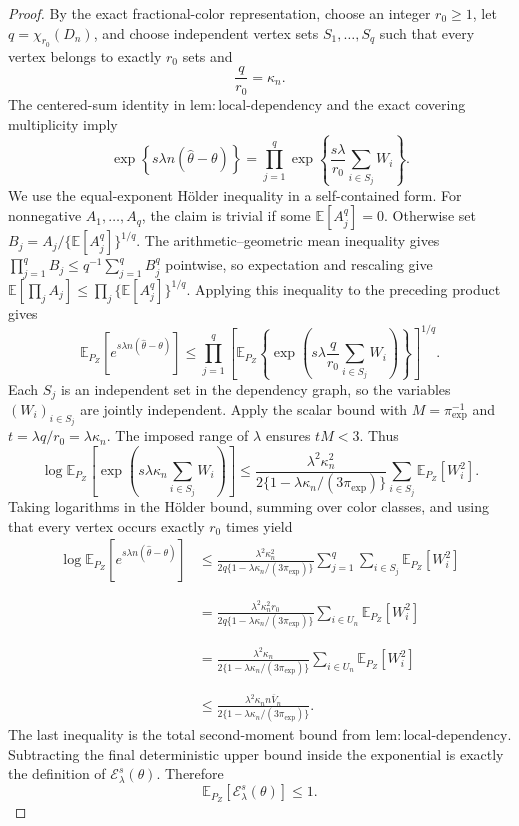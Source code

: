 \documentclass{article}
\begin{document}
\begin{proof}
By the exact fractional-color representation, choose an integer \(r_0\ge1\), let \(q=\chi_{r_0}(D_n)\), and choose independent vertex sets \(S_1,\ldots,S_q\) such that every vertex belongs to exactly \(r_0\) sets and
\[
\frac q{r_0}=\kappa_n.
\]
The centered-sum identity in \(\mathrm{lem{:}local\mbox{-}dependency}\) and the exact covering multiplicity imply
\[
\exp\left\{s\lambda n(\widehat\theta-\theta)\right\}
=\prod_{j=1}^q
\exp\left\{\frac{s\lambda}{r_0}\sum_{i\in S_j}W_i\right\}.
\]
We use the equal-exponent H\"older inequality in a self-contained form. For nonnegative \(A_1,\ldots,A_q\), the claim is trivial if some \(\mathbb E[A_j^q]=0\). Otherwise set \(B_j=A_j/\{\mathbb E[A_j^q]\}^{1/q}\). The arithmetic--geometric mean inequality gives \(\prod_{j=1}^q B_j\le q^{-1}\sum_{j=1}^q B_j^q\) pointwise, so expectation and rescaling give \(\mathbb E[\prod_j A_j]\le\prod_j\{\mathbb E[A_j^q]\}^{1/q}\). Applying this inequality to the preceding product gives
\[
\mathbb E_{P_Z}\!\left[e^{s\lambda n(\widehat\theta-\theta)}\right]
\le\prod_{j=1}^q
\left[
\mathbb E_{P_Z}\!\left\{
\exp\left(s\lambda\frac q{r_0}\sum_{i\in S_j}W_i\right)
\right\}
\right]^{1/q}.
\]
Each \(S_j\) is an independent set in the dependency graph, so the variables \((W_i)_{i\in S_j}\) are jointly independent. Apply the scalar bound with \(M=\pi_{\exp}^{-1}\) and \(t=\lambda q/r_0=\lambda\kappa_n\). The imposed range of \(\lambda\) ensures \(tM<3\). Thus
\[
\log\mathbb E_{P_Z}\!\left[
\exp\left(s\lambda\kappa_n\sum_{i\in S_j}W_i\right)
\right]
\le
\frac{\lambda^2\kappa_n^2}{2\{1-\lambda\kappa_n/(3\pi_{\exp})\}}
\sum_{i\in S_j}\mathbb E_{P_Z}[W_i^2].
\]
Taking logarithms in the H\"older bound, summing over color classes, and using that every vertex occurs exactly \(r_0\) times yield
\[
\begin{aligned}
\log\mathbb E_{P_Z}\!\left[e^{s\lambda n(\widehat\theta-\theta)}\right]
&\le
\frac{\lambda^2\kappa_n^2}{2q\{1-\lambda\kappa_n/(3\pi_{\exp})\}}
\sum_{j=1}^q\sum_{i\in S_j}\mathbb E_{P_Z}[W_i^2]\\\\\\
&=
\frac{\lambda^2\kappa_n^2r_0}{2q\{1-\lambda\kappa_n/(3\pi_{\exp})\}}
\sum_{i\in U_n}\mathbb E_{P_Z}[W_i^2]\\\\\\
&=
\frac{\lambda^2\kappa_n}{2\{1-\lambda\kappa_n/(3\pi_{\exp})\}}
\sum_{i\in U_n}\mathbb E_{P_Z}[W_i^2]\\\\\\
&\le
\frac{\lambda^2\kappa_n n\overline V_n}{2\{1-\lambda\kappa_n/(3\pi_{\exp})\}}.
\end{aligned}
\]
The last inequality is the total second-moment bound from \(\mathrm{lem{:}local\mbox{-}dependency}\). Subtracting the final deterministic upper bound inside the exponential is exactly the definition of \(\mathcal E_\lambda^s(\theta)\). Therefore
\[
\mathbb E_{P_Z}[\mathcal E_\lambda^s(\theta)]\le1.
\]
\end{proof}
\end{document}
